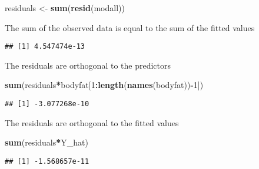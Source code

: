 \documentclass[]{article}
\newenvironment{Shaded}{\begin{snugshade}}{\end{snugshade}}
\newcommand{\DecValTok}[1]{\textcolor[rgb]{0.00,0.00,0.81}{#1}}
\newcommand{\KeywordTok}[1]{\textcolor[rgb]{0.13,0.29,0.53}{\textbf{#1}}}
\newcommand{\NormalTok}[1]{#1}
\newcommand{\OperatorTok}[1]{\textcolor[rgb]{0.81,0.36,0.00}{\textbf{#1}}}
\newcommand{\StringTok}[1]{\textcolor[rgb]{0.31,0.60,0.02}{#1}}
\begin{document}
\begin{Shaded}
\begin{Highlighting}[]
\NormalTok{residuals <-}\StringTok{ }\KeywordTok{sum}\NormalTok{(}\KeywordTok{resid}\NormalTok{(modall))}
\end{Highlighting}
\end{Shaded}

The sum of the observed data is equal to the sum of the fitted values

\begin{Shaded}
\end{Shaded}

\begin{verbatim}
## [1] 4.547474e-13
\end{verbatim}

The residuals are orthogonal to the predictors

\begin{Shaded}
\begin{Highlighting}[]
\KeywordTok{sum}\NormalTok{(residuals}\OperatorTok{*}\NormalTok{bodyfat[}\DecValTok{1}\OperatorTok{:}\KeywordTok{length}\NormalTok{(}\KeywordTok{names}\NormalTok{(bodyfat))}\OperatorTok{-}\DecValTok{1}\NormalTok{])}
\end{Highlighting}
\end{Shaded}

\begin{verbatim}
## [1] -3.077268e-10
\end{verbatim}

The residuals are orthogonal to the fitted values

\begin{Shaded}
\begin{Highlighting}[]
\KeywordTok{sum}\NormalTok{(residuals}\OperatorTok{*}\NormalTok{Y_hat)}
\end{Highlighting}
\end{Shaded}

\begin{verbatim}
## [1] -1.568657e-11
\end{verbatim}
\end{document}
